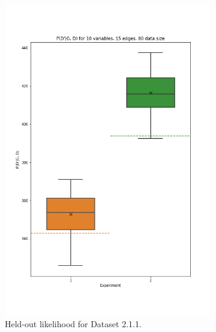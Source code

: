 \documentclass{lxaiproposal}
\begin{document}
\begin{figure}[h]
\begin{subfigure}{0.32\textwidth}
            \includegraphics[width=\textwidth]{figures/P_d_prime_10_15_80}
            \caption{Held-out likelihood for Dataset 2.1.1.}
            \label{fig:p_d_10_15_80}
        \end{subfigure}
        \begin{subfigure}{0.32\textwidth}
            \centering

\end{subfigure}
\end{figure}
\end{document}
